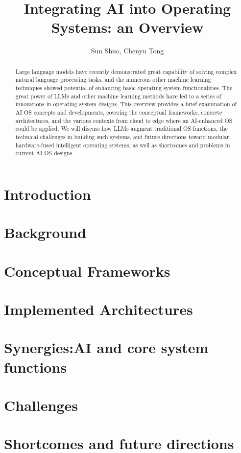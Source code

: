 \documentclass{article}
\title{Integrating AI into Operating Systems: an Overview}
\author{Sun Shuo, Chenyu Tong}
\begin{document}
\maketitle

\begin{abstract}
Large language models have recently demonstrated great capability of solving complex natural language processing
tasks, and the numerous other machine learning techniques showed potential of enhancing basic operating system 
functionalities. The great power of LLMs and other machine learning methods have led to a series of innovations 
in operating system designs. This overview provides a brief examination of AI OS concepts and developments, 
covering the conceptual frameworks, concrete architectures, and the various contexts from cloud to edge where an 
AI-enhanced OS could be applied. We will discuss how LLMs augment traditional OS functions, the technical challenges 
in building such systems, and future directions toward modular, hardware-fused intelligent operating systems, as well 
as shortcomes and problems in current AI OS designs.
\end{abstract}



\section{Introduction}


\section{Background}


\section{Conceptual Frameworks}


\section{Implemented Architectures}


\section{Synergies:AI and core system functions}



\section{Challenges}



\section{Shortcomes and future directions}
\end{document}

